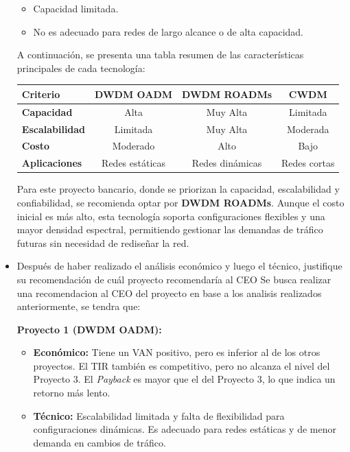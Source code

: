 \begin{itemize}
	\begin{itemize}
    	\item Capacidad limitada.
    	\item No es adecuado para redes de largo alcance o de alta capacidad.
	\end{itemize}
	A continuación, se presenta una tabla resumen de las características principales de cada tecnología:
	\begin{center}
		\begin{tabular}{|l|c|c|c|}
		\hline
		\rowcolor[HTML]{D9E1F2} 
		\textbf{Criterio}            & \textbf{DWDM OADM} & \textbf{DWDM ROADMs} & \textbf{CWDM} \\ \hline
		\textbf{Capacidad}           & Alta               & Muy Alta             & Limitada      \\ \hline
		\textbf{Escalabilidad}       & Limitada           & Muy Alta             & Moderada      \\ \hline
		\textbf{Costo}               & Moderado           & Alto                 & Bajo          \\ \hline
		\textbf{Aplicaciones}        & Redes estáticas    & Redes dinámicas       & Redes cortas  \\ \hline
		\end{tabular}
	\end{center}
	Para este proyecto bancario, donde se priorizan la capacidad, escalabilidad y confiabilidad, se recomienda optar por \textbf{DWDM ROADMs}. Aunque el costo inicial es más alto, esta tecnología soporta configuraciones flexibles y una mayor densidad espectral, permitiendo gestionar las demandas de tráfico futuras sin necesidad de rediseñar la red.
	\item Después de haber realizado el análisis económico y luego el técnico, justifique su recomendación de cuál proyecto recomendaría al CEO
	Se busca realizar una recomendacion al CEO del proyecto en base a los analisis realizados anteriormente, se tendra que:
	
\textbf{Proyecto 1 (DWDM OADM):}
\begin{itemize}
    \item \textbf{Económico:} Tiene un VAN positivo, pero es inferior al de los otros proyectos. El TIR también es competitivo, pero no alcanza el nivel del Proyecto 3. El \textit{Payback} es mayor que el del Proyecto 3, lo que indica un retorno más lento.
    \item \textbf{Técnico:} Escalabilidad limitada y falta de flexibilidad para configuraciones dinámicas. Es adecuado para redes estáticas y de menor demanda en cambios de tráfico.
\end{itemize}


\end{itemize}
